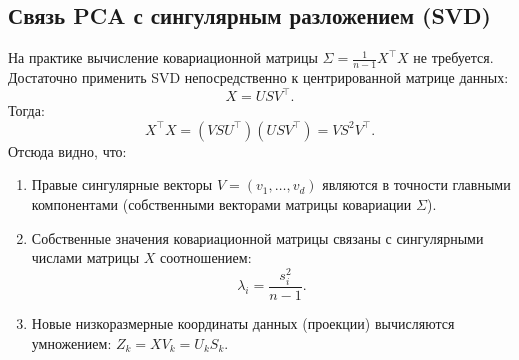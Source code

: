 \subsection{Связь PCA с сингулярным разложением (SVD)}
На практике вычисление ковариационной матрицы $\Sigma = \frac{1}{n-1} X^\top X$ не требуется.
Достаточно применить SVD непосредственно к центрированной матрице данных:
\[ X = U S V^\top. \]
Тогда:
\[ X^\top X = (V S U^\top)(U S V^\top) = V S^2 V^\top. \]
Отсюда видно, что:
\begin{enumerate}
    \item Правые сингулярные векторы $V = (v_1, \dots, v_d)$ являются в точности главными компонентами (собственными
    векторами матрицы ковариации $\Sigma$).
    \item Собственные значения ковариационной матрицы связаны с сингулярными числами матрицы $X$ соотношением:
    \[ \lambda_i = \frac{s_i^2}{n - 1}. \]
    \item Новые низкоразмерные координаты данных (проекции) вычисляются умножением: $Z_k = X V_k = U_k S_k$.
\end{enumerate}

\newpage

